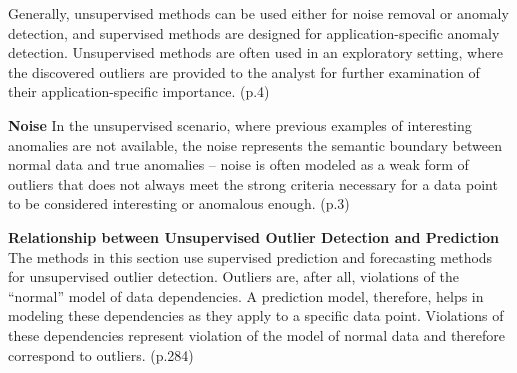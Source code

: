 Generally, unsupervised methods can be used either for noise removal or anomaly detection, and supervised methods are designed for application-specific anomaly detection. Unsupervised methods are often used in an exploratory setting, where the discovered outliers are provided to the analyst for further examination of their application-specific importance. (p.4)

\textbf{Noise}
In the unsupervised scenario, where previous examples of interesting anomalies are not available, the noise represents the semantic boundary between normal data and true anomalies – noise is often modeled as a weak form of outliers that does not always meet the strong criteria necessary for a data point to be considered interesting or anomalous enough. (p.3)

\textbf{Relationship between Unsupervised Outlier Detection and
Prediction}
The methods in this section use supervised prediction and forecasting methods for unsupervised outlier detection. Outliers are, after all, violations of the “normal” model of data dependencies. A prediction model, therefore, helps in modeling these dependencies as they apply to a specific data point. Violations of these dependencies represent violation of the model of normal data and therefore correspond to outliers. (p.284)